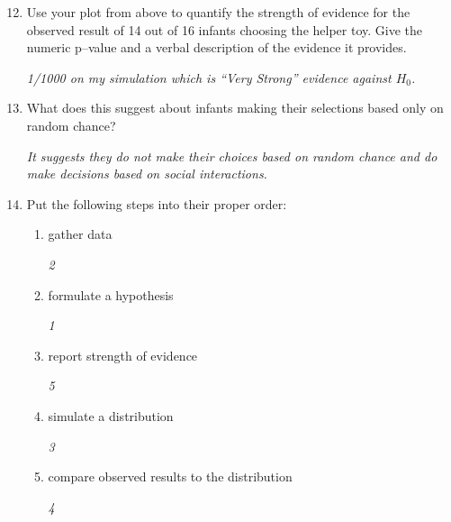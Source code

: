 \begin{enumerate}
  \setcounter{enumi}{11}

    \item  Use your plot from above to quantify the strength of
      evidence for the observed result 
      of 14 out of 16 infants choosing the helper toy. Give the
      numeric p--value  and a verbal description of the evidence it provides.
\begin{students}
  \vspace{1.5cm}
\end{students}

\begin{key}
{\it  1/1000 on my simulation which is ``Very Strong'' evidence
  against $H_0$.}
\end{key}

\item  What does this suggest about infants making their
      selections based only on random chance?
\begin{students}
  \vspace{4cm}
\end{students}

\begin{key}
{\it It suggests they do not make their choices based on random
 chance and do make decisions based on social interactions. }
\end{key}
\item  Put the following steps into their proper order:
 \begin{enumerate}
      \item  gather data 
\begin{key}
        {\it  2}
\end{key}

      \item  formulate a hypothesis 
\begin{key}
{\it 1   }
\end{key}

      \item  report strength of evidence 
\begin{key}
          {\it 5}
\end{key}

      \item  simulate a distribution 
\begin{key}
        {\it  3}
\end{key}
      \item  compare observed results to the distribution 
\begin{key}
        {\it  4}
\end{key}

  \end{enumerate}\vspace{1in}
\end{enumerate}

